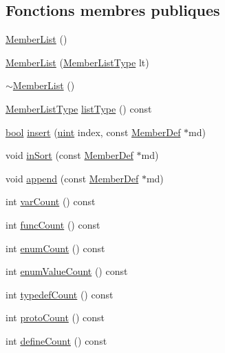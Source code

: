 \subsection*{Fonctions membres publiques}
\begin{DoxyCompactItemize}
\item 
\hyperlink{class_member_list_a7a663e0633b2d976bfa2b4e5d7927bca}{Member\+List} ()
\item 
\hyperlink{class_member_list_af8be5bea0593d2e019634085089bac31}{Member\+List} (\hyperlink{types_8h_abe8ad5992f8938a28f918f51b199aa19}{Member\+List\+Type} lt)
\item 
\hyperlink{class_member_list_aeecd2f64ef29c3ab1459524c38dc13da}{$\sim$\+Member\+List} ()
\item 
\hyperlink{types_8h_abe8ad5992f8938a28f918f51b199aa19}{Member\+List\+Type} \hyperlink{class_member_list_a6f01bcaaf76451694ae762fddfd34a88}{list\+Type} () const 
\item 
\hyperlink{qglobal_8h_a1062901a7428fdd9c7f180f5e01ea056}{bool} \hyperlink{class_member_list_ae89b439c97e61461d99810238dba6758}{insert} (\hyperlink{qglobal_8h_a4d3943ddea65db7163a58e6c7e8df95a}{uint} index, const \hyperlink{class_member_def}{Member\+Def} $\ast$md)
\item 
void \hyperlink{class_member_list_a43a217557a9253b279022b788fc4bb72}{in\+Sort} (const \hyperlink{class_member_def}{Member\+Def} $\ast$md)
\item 
void \hyperlink{class_member_list_aa85af958b0f7efe237d00565e219c672}{append} (const \hyperlink{class_member_def}{Member\+Def} $\ast$md)
\item 
int \hyperlink{class_member_list_aadde605d818399fc373da1928503bbe1}{var\+Count} () const 
\item 
int \hyperlink{class_member_list_ae687b2dbe772e145cbecc86b93232ae8}{func\+Count} () const 
\item 
int \hyperlink{class_member_list_aa96100fb7d5f28765baaf4db5ed5f4ca}{enum\+Count} () const 
\item 
int \hyperlink{class_member_list_aebb372f06ac6f52a0c4de29607d3eb12}{enum\+Value\+Count} () const 
\item 
int \hyperlink{class_member_list_a0513090842a3271dab6dd6a1bf5d7e25}{typedef\+Count} () const 
\item 
int \hyperlink{class_member_list_ae2d4adc6ba2d9bdc37899da0ab366acc}{proto\+Count} () const 
\item 
int \hyperlink{class_member_list_a264139f6ba1b24595c838c1a52de7c1a}{define\+Count} () const 

\end{DoxyCompactItemize}
